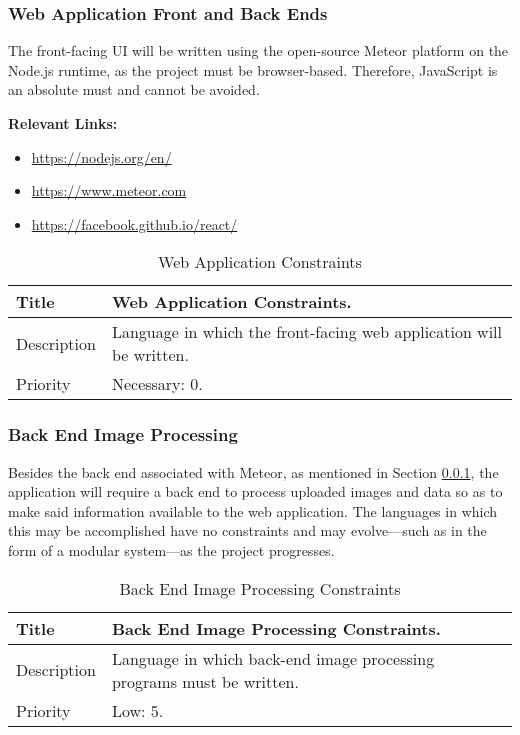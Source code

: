 \subsubsection{Web Application Front and Back Ends}
  \label{system-constraints/language/web-app}
  The front-facing UI will be written using the open-source Meteor platform on
  the Node.js runtime, as the project must be browser-based. Therefore,
  JavaScript is an absolute must and cannot be avoided.

  \textbf{Relevant Links:}
  \begin{itemize}
    \item \url{https://nodejs.org/en/}
    \item \url{https://www.meteor.com}
    \item \url{https://facebook.github.io/react/}
  \end{itemize}

  \begin{table}[h!]
    \caption{Web Application Constraints}
    \label{system-constraints/langauge/web-application-table}
    \begin{tabularx}{\textwidth}{|l|X|}
      \hline
      Title       & Web Application Constraints. \\ \hline
      Description & Language in which the front-facing web application will be
                    written. \\ \hline
      Priority    & Necessary: 0. \\ \hline
    \end{tabularx}
  \end{table}

\subsubsection{Back End Image Processing}
  Besides the back end associated with Meteor, as mentioned in Section
  \ref{system-constraints/language/web-app}, the application will require a
  back end to process uploaded images and data so as to make said information
  available to the web application. The languages in which this may be
  accomplished have no constraints and may evolve---such as in the form of a
  modular system---as the project progresses.

  \begin{table}[h!]
    \caption{Back End Image Processing Constraints}
    \label{system-constraints/langauge/back-end-processing-table}
    \begin{tabularx}{\textwidth}{|l|X|}
      \hline
      Title       & Back End Image Processing Constraints. \\ \hline
      Description & Language in which back-end image processing programs must be
                    written. \\ \hline
      Priority    & Low: 5. \\ \hline
    \end{tabularx}
  \end{table}

